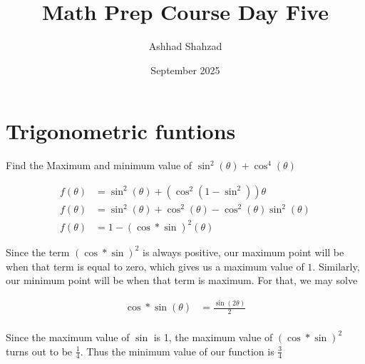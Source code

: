 \documentclass{article}
\title{Math Prep Course Day Five}
\author{Ashhad Shahzad}
\date{September 2025}
\begin{document}
\maketitle

\section{Trigonometric funtions}

\begin{question}{}{}
Find the Maximum and minimum value of \(\sin^2(\theta) + \cos^4(\theta) \)
\end{question}

\begin{align*}
	f(\theta) &=\sin^2 (\theta) + (\cos^2 (1-\sin^2)) \theta \\
	f(\theta) &=\sin^2 (\theta) + \cos^2 (\theta) - \cos^2 (\theta) \sin^2 (\theta) \\
	f(\theta) &=1 - (\cos *\sin)^2 (\theta)
\end{align*}

Since the term \((\cos *\sin)^2\) is always positive, our maximum point will be when that term is equal to zero, which gives us a maximum value of \(1\). Similarly, our minimum point will be when that term is maximum. For that, we may solve

\begin{align*}
	\cos *\sin (\theta) &= \frac{\sin (2\theta)}{2} \\
\end{align*}

Since the maximum value of \(\sin\) is 1, the maximum value of \((\cos *\sin)^2\) turns out to be \(\frac{1}{4}\). Thus the minimum value of our function is \(\frac{3}{4}\)
\end{document}
